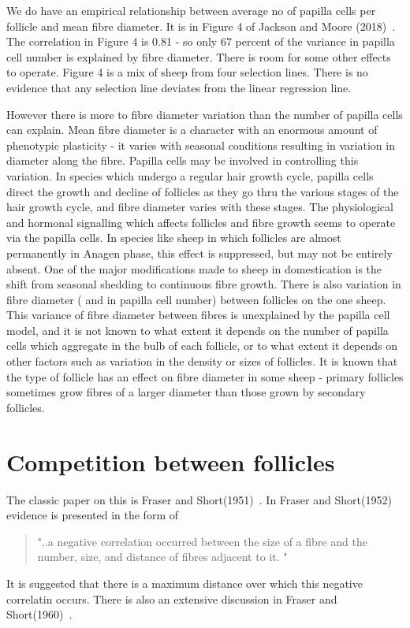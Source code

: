 \documentclass[titlepage]{article}  %
\begin{document}
We do have an empirical relationship between average no of papilla cells per follicle and mean fibre diameter. It is in Figure 4 of Jackson and Moore (2018)~\cite{jack:18}. The correlation in Figure 4 is 0.81 - so only 67 percent of the variance in papilla cell number is explained by fibre diameter. There is room for some other effects to operate. Figure 4 is a mix of sheep from four selection lines. There is no evidence that any selection line deviates from the linear regression line.

However there is more to fibre diameter variation than the number of papilla cells can explain. Mean fibre diameter is a character with an enormous amount of phenotypic plasticity - it varies with seasonal conditions resulting in variation in diameter along the fibre. Papilla cells may be involved in controlling this variation. In species which undergo a regular hair growth cycle, papilla cells direct the growth and decline of follicles as they go thru the various stages of the hair growth cycle, and fibre diameter varies with these stages. The physiological and hormonal signalling which affects follicles  and fibre growth seems to operate via the papilla cells. In species like sheep in which follicles are almost permanently in Anagen phase, this effect is suppressed, but may not be entirely absent. One of the major modifications made to sheep in domestication is the shift from seasonal shedding to continuous fibre growth. There is also variation in fibre diameter ( and in papilla cell number) between follicles on the one sheep. This variance of fibre diameter between fibres is unexplained by the papilla cell model, and it is not known to what extent it depends on the number of papilla cells which aggregate in the bulb of each follicle, or to what extent it depends on other factors such as variation in the density or sizes of follicles. It is known that the type of follicle has an effect on fibre diameter in some sheep - primary follicles sometimes grow fibres of a larger diameter than those grown by secondary follicles.

\section{Competition between follicles}
The classic paper on this is Fraser and Short(1951)~\cite{fras:51}.  In Fraser and Short(1952)~\cite{fras:52} evidence is presented in the form of
\begin{quote}
"..a negative correlation occurred between the size of a fibre and the number, size, and distance of fibres adjacent to it.  "
\end{quote}
It is suggested that there is a maximum distance over which this negative correlatin occurs.
There is also an extensive discussion in Fraser and Short(1960)~\cite{fras:60}.
\end{document}
